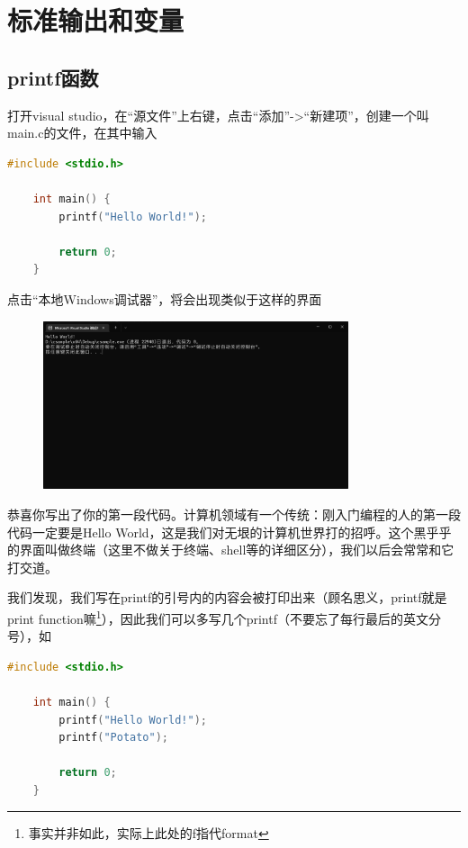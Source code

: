 \section{标准输出和变量}

\subsection{printf函数}

打开visual studio，在“源文件”上右键，点击“添加”->“新建项”，创建一个叫main.c的文件，在其中输入

\begin{lstlisting}[language=C]
    #include <stdio.h>
    
    int main() {
        printf("Hello World!");

        return 0;
    }
\end{lstlisting}

点击“本地Windows调试器”，将会出现类似于这样的界面

\begin{figure}[H]
    \centering
    \includegraphics[width=0.8\textwidth, height=0.4\textheight]{images/1HelloWorld结果.png}
\end{figure}

恭喜你写出了你的第一段代码。计算机领域有一个传统：刚入门编程的人的第一段代码一定要是Hello World，这是我们对无垠的计算机世界打的招呼。这个黑乎乎的界面叫做终端（这里不做关于终端、shell等的详细区分），我们以后会常常和它打交道。

我们发现，我们写在printf的引号内的内容会被打印出来（顾名思义，printf就是print function嘛\footnote{事实并非如此，实际上此处的f指代format}），因此我们可以多写几个printf（不要忘了每行最后的英文分号），如

\begin{lstlisting}[language=C]
    #include <stdio.h>
    
    int main() {
        printf("Hello World!");
        printf("Potato");

        return 0;
    }
\end{lstlisting}

